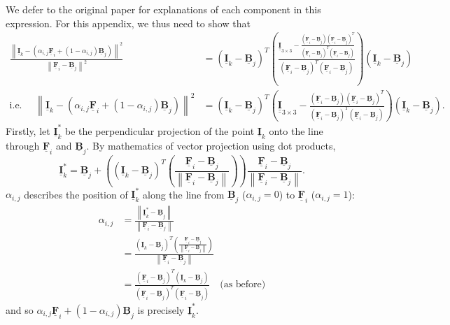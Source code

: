 \documentclass{article}
\def\vt#1{\underline{\mathbf{#1}}}
\def\mt#1{\underline{\underline{\mathbf{#1}}}}
\begin{document}
We defer to the original paper \cite{robust-matting} for explanations of each component in this expression. For this appendix, we thus need to show that
\begin{align*}
    \frac{\left\| \vt I_k - \left( \alpha_{i,j}\vt F_i + (1-\alpha_{i,j})\vt B_j\right)  \right\|^2}{\left\| \vt F_i - \vt B_j \right\|^2} &= \left(\vt I_k - \vt B_j \right)^T          \left( \frac{\mt I_{3\times 3} -  \frac{\left(\vt F_i - \vt B_j\right)\left(\vt F_i - \vt B_j\right)^T}{\left(\vt F_i - \vt B_j\right)^T\left(\vt F_i - \vt B_j\right)}}{\left(\vt F_i - \vt B_j\right)^T\left(\vt F_i - \vt B_j\right)}\right)     \left(\vt I_k - \vt B_j \right)  \\
    \text{i.e.\ }\quad\left\| \vt I_k - \left( \alpha_{i,j}\vt F_i + (1-\alpha_{i,j})\vt B_j\right)  \right\|^2 &= \left(\vt I_k - \vt B_j \right)^T          \left( \mt I_{3\times 3} -  \frac{\left(\vt F_i - \vt B_j\right)\left(\vt F_i - \vt B_j\right)^T}{\left(\vt F_i - \vt B_j\right)^T\left(\vt F_i - \vt B_j\right)}\right)     \left(\vt I_k - \vt B_j \right).
\end{align*}
Firstly, let $\vt I_k^*$ be the perpendicular projection of the point $\vt I_k$ onto the line through $\vt F_i$ and $\vt B_j$. By mathematics of vector projection using dot products,
$$\vt I_k^* = \vt B_j + \left( \left(\vt I_k - \vt B_j\right)^T \left( \frac{\vt F_i - \vt B_j}{\left\| \vt F_i - \vt B_j \right\|}\right) \right) \frac{\vt F_i - \vt B_j}{\left\| \vt F_i - \vt B_j \right\|}.$$
$\alpha_{i,j}$ describes the position of $\vt I_k^*$ along the line from $\vt B_j$ ($\alpha_{i,j}=0$) to $\vt F_i$ ($\alpha_{i,j}=1$):
\begin{align*}
    \alpha_{i,j} &= \frac{\left\| \vt I_k^* - \vt B_j  \right\|}{\left\| \vt F_i - \vt B_j  \right\|}\\
    &= \frac{\left(\vt I_k - \vt B_j\right)^T \left( \frac{\vt F_i - \vt B_j}{\left\| \vt F_i - \vt B_j \right\|}\right)}{\left\| \vt F_i - \vt B_j  \right\|}\\
    &=\frac{\left(\vt F_i - \vt B_j\right)^T\left(\vt I_k - \vt B_j\right)}{\left(\vt F_i - \vt B_j\right)^T\left(\vt F_i - \vt B_j\right)}  \quad\text{(as before)}
\end{align*}
and so $\alpha_{i,j}\vt F_i + (1-\alpha_{i,j})\vt B_j$ is precisely $\vt I_k^*$.
\end{document}
